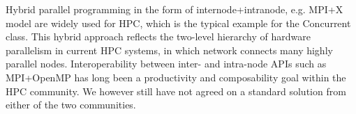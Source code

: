 Hybrid parallel programming in the form of internode+intranode, e.g. MPI+X model are widely used  
for HPC, which is the typical example for the Concurrent class. 
This hybrid approach reflects the two-level hierarchy of hardware parallelism 
in current HPC systems, in which network connects many highly parallel nodes.
Interoperability between inter- and intra-node APIs such as MPI+OpenMP 
has long been a productivity and composability goal within
the HPC community. We however still have not agreed on a 
standard solution from either of the two communities. 


